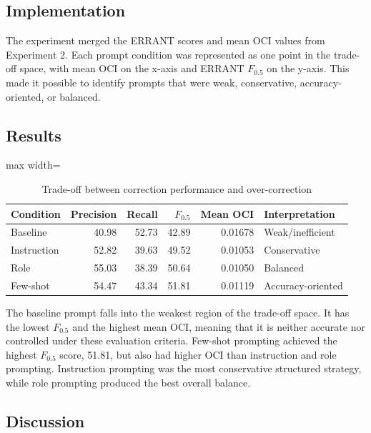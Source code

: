 \subsection{Implementation}

The experiment merged the ERRANT scores and mean OCI values from Experiment 2. Each prompt condition was represented as one point in the trade-off space, with mean OCI on the x-axis and ERRANT $F_{0.5}$ on the y-axis. This made it possible to identify prompts that were weak, conservative, accuracy-oriented, or balanced.

\subsection{Results}

\begin{table}[htbp]
    \centering
    \caption{Trade-off between correction performance and over-correction}
    \label{tab:exp5_tradeoff}
    \renewcommand{\arraystretch}{1.15}
    \begin{adjustbox}{max width=\textwidth}
    \begin{tabular}{lrrrrl}
        \toprule
        \textbf{Condition} & \textbf{Precision} & \textbf{Recall} & \textbf{$F_{0.5}$} & \textbf{Mean OCI} & \textbf{Interpretation} \\
        \midrule
        Baseline    & 40.98 & 52.73 & 42.89 & 0.01678 & Weak/inefficient \\
        Instruction & 52.82 & 39.63 & 49.52 & 0.01053 & Conservative \\
        Role        & 55.03 & 38.39 & 50.64 & 0.01050 & Balanced \\
        Few-shot    & 54.47 & 43.34 & 51.81 & 0.01119 & Accuracy-oriented \\
        \bottomrule
    \end{tabular}
    \end{adjustbox}
\end{table}

The baseline prompt falls into the weakest region of the trade-off space. It has the lowest $F_{0.5}$ and the highest mean OCI, meaning that it is neither accurate nor controlled under these evaluation criteria. Few-shot prompting achieved the highest $F_{0.5}$ score, 51.81, but also had higher OCI than instruction and role prompting. Instruction prompting was the most conservative structured strategy, while role prompting produced the best overall balance.

\subsection{Discussion}

